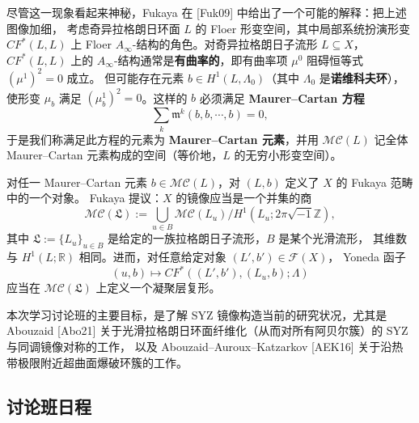 
尽管这一现象看起来神秘，Fukaya 在 [Fuk09] 中给出了一个可能的解释：把上述图像加细，
考虑奇异拉格朗日环面 $L$ 的 Floer 形变空间，其中局部系统扮演形变 $CF^{\ast}(L,L)$ 上
Floer $A_{\infty}$-结构的角色。对奇异拉格朗日子流形 $L\subseteq X$，$CF^{\ast}(L,L)$ 上的
$A_{\infty}$-结构通常是\textbf{有曲率的}，即有曲率项 $\mu^0$ 阻碍恒等式 $(\mu^1)^2=0$ 成立。
但可能存在元素 $b\in H^1(L,\Lambda_0)$（其中 $\Lambda_0$ 是\textbf{诺维科夫环}），使形变 $\mu_b$ 满足
$(\mu_b^1)^2=0$。这样的 $b$ 必须满足 \textbf{Maurer--Cartan 方程}
\[
  \sum_k\mathfrak{m}^k(b,b,\dotsb,b)=0,
\]
于是我们称满足此方程的元素为 \textbf{Maurer--Cartan 元素}，并用 $\mathcal{MC}(L)$ 记全体
Maurer--Cartan 元素构成的空间（等价地，$L$ 的无穷小形变空间）。


对任一 Maurer--Cartan 元素 $b\in\mathcal{MC}(L)$，对 $(L,b)$ 定义了 $X$ 的 Fukaya 范畴中的一个对象。
Fukaya 提议：$X$ 的镜像应当是一个并集的商
\[
  \mathcal{MC}(\mathfrak{L}):=\bigcup_{u\in B}\mathcal{MC}(L_u)\big/H^1(L_u;2\pi\sqrt{-1}\mathbb{Z}),
\]
其中 $\mathfrak{L}:=\{L_u\}_{u\in B}$ 是给定的一族拉格朗日子流形，$B$ 是某个光滑流形，
其维数与 $H^1(L;\mathbb{R})$ 相同。进而，对任意给定对象 $(L',b')\in\mathcal{F}(X)$，
Yoneda 函子
\[
  (u,b)\mapsto CF^{\ast}((L',b'),(L_u,b);\Lambda)
\]
应当在 $\mathcal{MC}(\mathfrak{L})$ 上定义一个凝聚层复形。


本次学习讨论班的主要目标，是了解 SYZ 镜像构造当前的研究状况，尤其是 Abouzaid [Abo21]
关于光滑拉格朗日环面纤维化（从而对所有阿贝尔簇）的 SYZ 与同调镜像对称的工作，
以及 Abouzaid--Auroux--Katzarkov [AEK16] 关于沿热带极限附近超曲面爆破环簇的工作。

\subsection*{讨论班日程}

